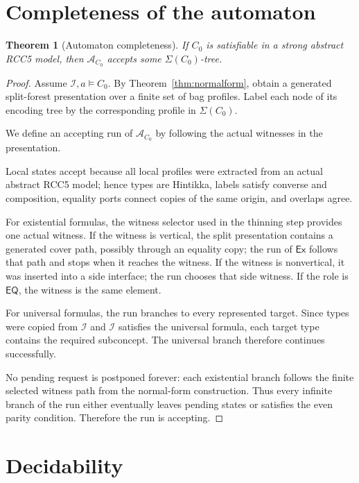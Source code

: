 \documentclass[11pt]{article}
\newtheorem{theorem}{Theorem}[section]
\newcommand{\EQ}{\mathsf{EQ}}
\newcommand{\Aut}{\mathcal A}
\begin{document}
\section{Completeness of the automaton}

\begin{theorem}[Automaton completeness]\label{thm:complete}
If $C_0$ is satisfiable in a strong abstract RCC5 model, then $\Aut_{C_0}$ accepts some $\Sigma(C_0)$-tree.
\end{theorem}

\begin{proof}
Assume $\mathcal I,a\models C_0$.  By Theorem~\ref{thm:normalform}, obtain a generated split-forest presentation over a finite set of bag profiles.  Label each node of its encoding tree by the corresponding profile in $\Sigma(C_0)$.

We define an accepting run of $\Aut_{C_0}$ by following the actual witnesses in the presentation.

Local states accept because all local profiles were extracted from an actual abstract RCC5 model; hence types are Hintikka, labels satisfy converse and composition, equality ports connect copies of the same origin, and overlaps agree.

For existential formulas, the witness selector used in the thinning step provides one actual witness.  If the witness is vertical, the split presentation contains a generated cover path, possibly through an equality copy; the run of $\mathsf{Ex}$ follows that path and stops when it reaches the witness.  If the witness is nonvertical, it was inserted into a side interface; the run chooses that side witness.  If the role is $\EQ$, the witness is the same element.

For universal formulas, the run branches to every represented target.  Since types were copied from $\mathcal I$ and $\mathcal I$ satisfies the universal formula, each target type contains the required subconcept.  The universal branch therefore continues successfully.

No pending request is postponed forever: each existential branch follows the finite selected witness path from the normal-form construction.  Thus every infinite branch of the run either eventually leaves pending states or satisfies the even parity condition.  Therefore the run is accepting.
\end{proof}

\section{Decidability}
\end{document}

